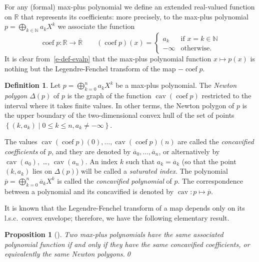 \documentclass[a4paper]{amsart}
\theoremstyle{definition}
\newtheorem{defn}{Definition}
\theoremstyle{plain}
\newtheorem{prop}[thm]{Proposition}
\theoremstyle{remark}
\begin{document}
For any (formal) max-plus polynomial we define an extended real-valued function on ${\mathbb{R}}$ that represents its coefficients:
more precisely, to the max-plus polynomial ${p = \bigoplus_{k \in {\mathbb{N}}} a_k X^k}$ we associate the function
\[
 \operatorname{coef} p \colon {\mathbb{R}} \to \overline{\mathbb{R}} \qquad (\operatorname{coef} p)(x) = 
 \begin{cases}
  a_k &\mbox{if } x = k \in {\mathbb{N}} \\
  -\infty &\mbox{otherwise.}
 \end{cases}
\]
It is clear from~\eqref{e-def-evalp} that the max-plus polynomial
function $x\mapsto p(x)$ is 
nothing but the Legendre-Fenchel transform of the map $-\operatorname{coef} p$.

\begin{defn}
 Let $p = \bigoplus_{k=0}^{n} a_k X^k$ be a max-plus polynomial.
 The \emph{Newton polygon} $\Delta(p)$ of $p$ is the graph of the function $\operatorname{cav} (\operatorname{coef} p)$ restricted to the interval where it takes finite values.
 In other terms, the Newton polygon of $p$ is the upper boundary of the two-dimensional convex hull
 of the set of points $\left\{ (k, a_k) \mid 0 {\leqslant} k {\leqslant} n, a_k \neq -\infty \right\}$.
\end{defn}
The values $\operatorname{cav} (\operatorname{coef} p)(0), \dots, \operatorname{cav} (\operatorname{coef} p)(n)$ are called the \emph{concavified coefficients} of $p$,
and they are denoted by $\overline{a}_0, \dots, \overline{a}_n$,
or alternatively by $\operatorname{cav} (a_0),$ \dots, $\operatorname{cav} (a_n)$.
An index $k$ such that $a_k = \overline{a}_k$ (so that the point
$(k,a_k)$ lies on $\Delta(p)$) will be called
a \emph{saturated index}.
The polynomial $\overline{p} = \bigoplus_{k = 0}^{n} \overline{a}_k X^{k}$ is called the
\emph{concavified polynomial} of $p$.
The correspondence between a polynomial and its concavified is denoted by $\operatorname{cav} \colon p \mapsto \overline{p}$.

It is known that the Legendre-Fenchel transform of a map
depends only on its l.s.c.\ convex envelope; therefore,
we have the following elementary result.
\begin{prop}[{\cite[Chap~12, p.~104]{rockafellar}}]
Two max-plus polynomials have the same associated polynomial function
 if and only if they have the same concavified coefficients, or equivalently
the same Newton polygons.\qed
\end{prop}
\end{document}

